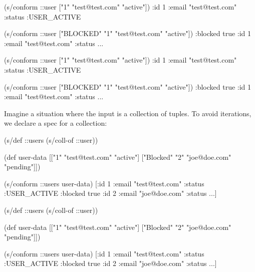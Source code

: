 \ifx\DEVICETYPE\MOBILE

\begin{english}
  \begin{clojure}
(s/conform ::user
  ["1" "test@test.com" "active"])
{:id 1
 :email "test@test.com"
 :status :USER_ACTIVE}

(s/conform ::user
  ["BLOCKED" "1"
   "test@test.com" "active"])
{:blocked true
 :id 1
 :email "test@test.com"
 :status ...}
  \end{clojure}
\end{english}

\else

\begin{english}
  \begin{clojure}
(s/conform ::user ["1" "test@test.com" "active"])
{:id 1 :email "test@test.com" :status :USER_ACTIVE}

(s/conform ::user ["BLOCKED" "1" "test@test.com" "active"])
{:blocked true :id 1 :email "test@test.com" :status ...}
  \end{clojure}
\end{english}

\fi

Imagine a situation where the input is a collection of tuples. To avoid iterations, we declare a spec for a collection:

\ifx\DEVICETYPE\MOBILE

\begin{english}
  \begin{clojure}
(s/def ::users (s/coll-of ::user))

(def user-data
  [["1" "test@test.com" "active"]
   ["Blocked" "2" "joe@doe.com"
    "pending"]])

(s/conform ::users user-data)
[{:id 1
  :email "test@test.com"
  :status :USER_ACTIVE}
 {:blocked true
  :id 2
  :email "joe@doe.com"
  :status ...}]
  \end{clojure}
\end{english}

\else

\begin{english}
  \begin{clojure}
(s/def ::users (s/coll-of ::user))

(def user-data
  [["1" "test@test.com" "active"]
   ["Blocked" "2" "joe@doe.com" "pending"]])

(s/conform ::users user-data)
[{:id 1 :email "test@test.com" :status :USER_ACTIVE}
 {:blocked true :id 2 :email "joe@doe.com" :status ...}]
  \end{clojure}
\end{english}

